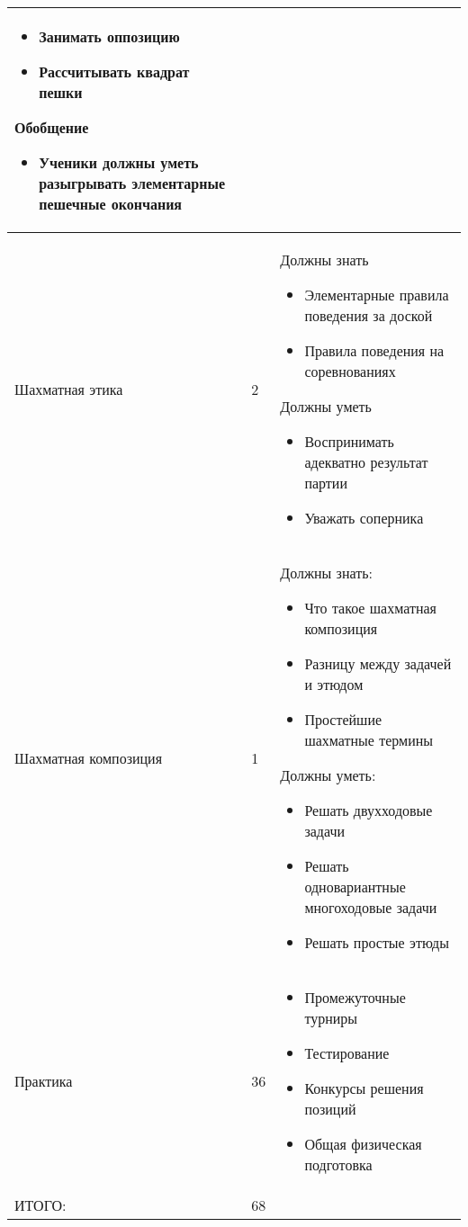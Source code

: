 \begin{center}
\begin{longtable}{ p{} | p{} | p{} }
\begin{itemize}
\item Занимать оппозицию
\item Рассчитывать квадрат пешки
\end{itemize}
Обобщение
\begin{itemize}
\item Ученики должны уметь разыгрывать элементарные пешечные окончания
\end{itemize} \\ \hline
Шахматная этика & 2 & Должны знать
\begin{itemize}
\item Элементарные правила поведения за доской
\item Правила поведения на соревнованиях
\end{itemize}
Должны уметь
\begin{itemize}
\item Воспринимать адекватно результат партии
\item Уважать соперника
\end{itemize} \\ \hline
Шахматная композиция & 1 & Должны знать:
\begin{itemize}
\item Что такое шахматная композиция
\item Разницу между задачей и этюдом
\item Простейшие шахматные термины
\end{itemize}
Должны уметь:
\begin{itemize}
\item Решать двухходовые задачи
\item Решать одновариантные многоходовые задачи
\item Решать простые этюды
\end{itemize} \\ \hline
Практика & 36 & \begin{itemize}
\item Промежуточные турниры
\item Тестирование 
\item Конкурсы решения позиций
\item Общая физическая подготовка
\end{itemize} \\ \hline
ИТОГО: & 68 & \\
\end{longtable}
\end{center}

